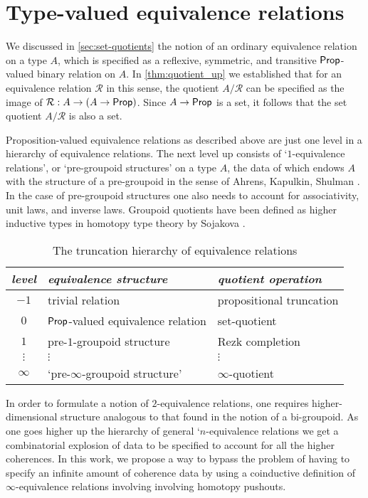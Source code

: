 \chapter{Type-valued equivalence relations}\label{chap:giraud}

We discussed in \cref{sec:set-quotients} the notion of an ordinary equivalence relation on a type $A$, which is specified as a reflexive, symmetric, and transitive $\mathsf{Prop}$-valued binary relation on $A$. In \cref{thm:quotient_up} we established that for an equivalence relation $\mathcal{R}$ in this sense, the quotient $A/\mathcal{R}$ can be specified as the image of $\mathcal{R}:A\to (A\to \mathsf{Prop})$. Since $A\to \mathsf{Prop}$ is a set, it follows that the set quotient $A/\mathcal{R}$ is also a set. 

Proposition-valued equivalence relations as described above are just one level in a hierarchy of equivalence relations. The next level up consists of `$1$-equivalence relations', or `pre-groupoid structures' on a type $A$, the data of which endows $A$ with the structure of a pre-groupoid in the sense of Ahrens, Kapulkin, Shulman \cite{AhrensKapulkinShulman}. In the case of pre-groupoid structures one also needs to account for associativity, unit laws, and inverse laws. Groupoid quotients have been defined as higher inductive types in homotopy type theory by Sojakova \cite{SojakovaPhD}.

\begin{table}\label{tab:hierarchy}
\caption{The truncation hierarchy of equivalence relations}
\begin{tabular}{cll}
\toprule
\emph{level} & \emph{equivalence structure} & \emph{quotient operation} \\
\midrule
$-1$ & trivial relation & propositional truncation \\
$0$ & $\mathsf{Prop}$-valued equivalence relation & set-quotient \\
$1$ & pre-$1$-groupoid structure & Rezk completion \\
$\vdots$ & \qquad$\vdots$ & \qquad$\vdots$ \\
$\infty$ & `pre-$\infty$-groupoid structure' & $\infty$-quotient \\
\bottomrule
\end{tabular}
\end{table}

In order to formulate a notion of $2$-equivalence relations, one requires higher-dimensional structure analogous to that found in the notion of a bi-groupoid. As one goes higher up the hierarchy of general `$n$-equivalence relations we get a combinatorial explosion of data to be specified to account for all the higher coherences. In this work, we propose a way to bypass the problem of having to specify an infinite amount of coherence data by using a coinductive definition of $\infty$-equivalence relations involving involving homotopy pushouts.

